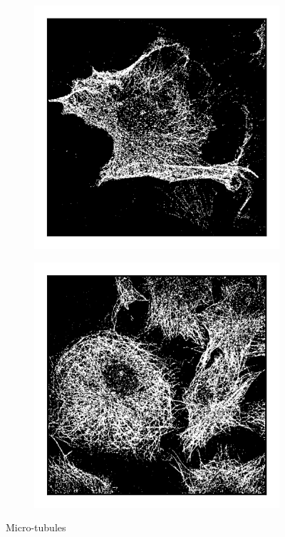\begin{figure}
\begin{subfigure}{0.32\textwidth}
        \includegraphics[width=\textwidth]{figures/microtubules_image4.png}
        \caption{}
    \end{subfigure}
    \begin{subfigure}{0.32\textwidth}
        \includegraphics[width=\textwidth]{figures/microtubules_image6.png}
        \caption{}
    \end{subfigure}
    \caption{Micro-tubules}
\end{figure}

